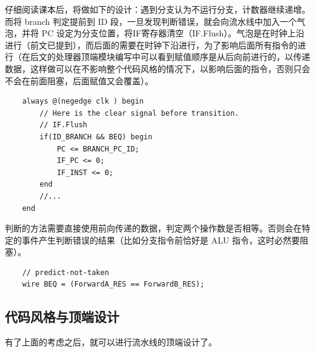\documentclass[a4paper,UTF8]{ctexart}
\begin{document}
仔细阅读课本后，将做如下的设计：遇到分支认为不运行分支，计数器继续递增。而将 branch 判定提前到 ID 段，一旦发现判断错误，就会向流水线中加入一个气泡，并将 PC 设定为分支位置，将IF寄存器清空（IF.Flush）。气泡是在时钟上沿进行（前文已提到），而后面的需要在时钟下沿进行，为了影响后面所有指令的进行（在后文的处理器顶端模块编写中可以看到赋值顺序是从后向前进行的，以传递数据，这样做可以在不影响整个代码风格的情况下，以影响后面的指令，否则只会不会在前面阻塞，后面赋值又会覆盖）。

\begin{lstlisting}
    always @(negedge clk ) begin
        // Here is the clear signal before transition.
        // IF.Flush
        if(ID_BRANCH && BEQ) begin
            PC <= BRANCH_PC_ID;
            IF_PC <= 0;
            IF_INST <= 0;
        end
        //...
    end
\end{lstlisting}

判断的方法需要直接使用前向传递的数据，判定两个操作数是否相等。否则会在特定的事件产生判断错误的结果（比如分支指令前恰好是 ALU 指令，这时必然要阻塞）。

\begin{lstlisting}
    // predict-not-taken
    wire BEQ = (ForwardA_RES == ForwardB_RES);
\end{lstlisting}

\subsection{代码风格与顶端设计}\label{sec:code}

有了上面的考虑之后，就可以进行流水线的顶端设计了。
\end{document}
